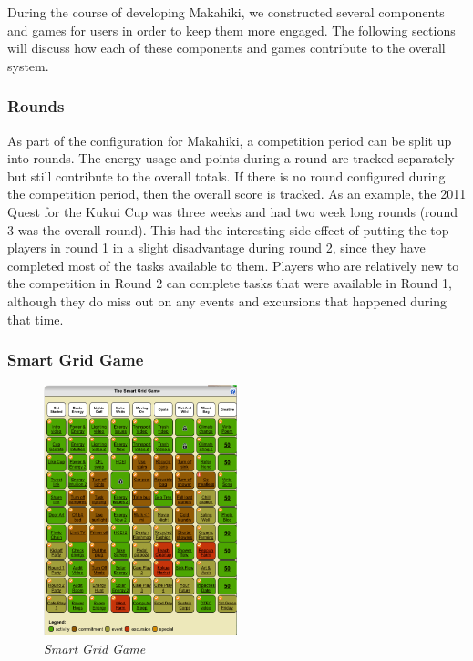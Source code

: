 \documentclass{acm_proc_article-sp}
\begin{document}
During the course of developing Makahiki, we constructed several components and games for users in order to keep them more engaged. The following sections will discuss how each of these components and games contribute to the overall system.

\subsubsection{Rounds}

As part of the configuration for Makahiki, a competition period can be split up into rounds. The energy usage and points during a round are tracked separately but still contribute to the overall totals. If there is no round configured during the competition period, then the overall score is tracked. As an example, the 2011 Quest for the Kukui Cup was three weeks and had two week long rounds (round 3 was the overall round). This had the interesting side effect of putting the top players in round 1 in a slight disadvantage during round 2, since they have completed most of the tasks available to them. Players who are relatively new to the competition in Round 2 can complete tasks that were available in Round 1, although they do miss out on any events and excursions that happened during that time.

\subsubsection{Smart Grid Game}

\begin{figure}[h!]
  \center
  \includegraphics[width=0.5\textwidth]{smart-grid.eps}
  \caption{\em \small Smart Grid Game}
  \label{fig:SmartGrid}
\end{figure}
\end{document}
